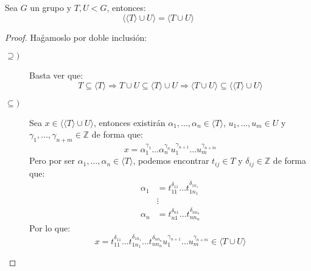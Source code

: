 \begin{lema}
    Sea $G$ un grupo y $T, U < G$, entonces:
    \begin{equation*}
        \langle \langle T \rangle \cup U \rangle  = \langle T\cup U \rangle 
    \end{equation*}
    \begin{proof}
        Haǵamoslo por doble inclusión:
        \begin{description}
            \item [$\supseteq)$] Basta ver que:
                \begin{equation*}
                    T\subseteq \langle T \rangle \Longrightarrow T\cup U \subseteq \langle T \rangle \cup U \Longrightarrow \langle T\cup U \rangle \subseteq \langle \langle T \rangle \cup U \rangle 
                \end{equation*}
            \item [$\subseteq)$] Sea $x\in \langle \langle T \rangle \cup U \rangle $, entonces existirán $\alpha_1,\ldots,\alpha_n\in \langle T \rangle $, $u_1,\ldots,u_m\in U$ y $\gamma_1,\ldots,\gamma_{n+m}\in \mathbb{Z}$ de forma que:
                \begin{equation*}
                    x = \alpha_1^{\gamma_1}\ldots \alpha_n^{\gamma_n}u_1^{\gamma_{n+1}}\ldots u_m^{\gamma_{n+m}}
                \end{equation*}
                Pero por ser $\alpha_1,\ldots,\alpha_n\in \langle T \rangle $, podemos encontrar $t_{ij}\in T$ y $\delta_{ij}\in \mathbb{Z}$ de forma que:
                \begin{align*}
                    \alpha_1 &= t_{11}^{\delta_{11}}\ldots t_{1n_1}^{\delta_{1n_1}} \\
                             &\vdots \\
                    \alpha_n &= t_{n1}^{\delta_{n1}}\ldots t_{nn_n}^{\delta_{nn_n}}
                \end{align*}
                Por lo que:
                \begin{equation*}
                    x = t_{11}^{\delta_{11}}\ldots t_{1n_1}^{\delta_{1n_1}} \ldots t_{nn_n}^{\delta_{nn_n}}u_1^{\gamma_{n+1}}\ldots u_m^{\gamma_{n+m}} \in \langle T\cup U \rangle 
                \end{equation*}
        \end{description}
    \end{proof}
\end{lema}

